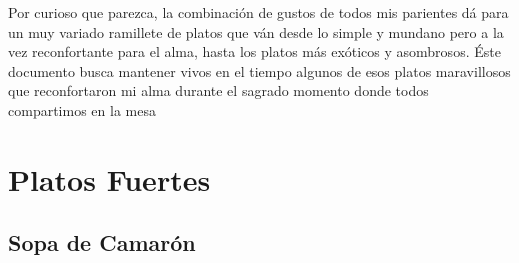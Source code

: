 \documentclass[letterpaper]{book}
\begin{document}
Por curioso que parezca, la combinación de gustos de todos mis parientes dá para un muy variado ramillete de platos que ván desde lo simple y mundano pero a la vez reconfortante para el alma, hasta los platos más exóticos y asombrosos. Éste documento busca mantener vivos en el tiempo algunos de esos platos maravillosos que reconfortaron mi alma durante el sagrado momento donde todos compartimos en la mesa \textellipsis
\tableofcontents
\mainmatter
\part{Platos Fuertes}
\chapter{Sopa de Camarón}
\end{document}
